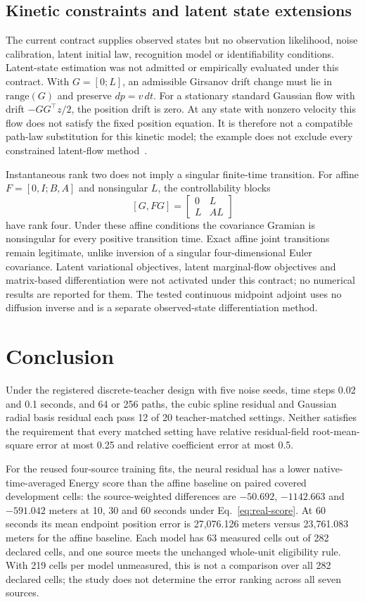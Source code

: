 \documentclass[11pt]{article}
\begin{document}
\subsection{Kinetic constraints and latent state extensions}\label{sec:latent}
The current contract supplies observed states but no observation likelihood, noise calibration, latent initial law, recognition model or identifiability conditions. Latent-state estimation was not admitted or empirically evaluated under this contract. With $G=[0;L]$, an admissible Girsanov drift change must lie in $\mathrm{range}(G)$ and preserve $dp=v\,dt$. For a stationary standard Gaussian flow with drift $-GG^\top z/2$, the position drift is zero. At any state with nonzero velocity this flow does not satisfy the fixed position equation. It is therefore not a compatible path-law substitution for this kinetic model; the example does not exclude every constrained latent-flow method~\cite{bartosh2025}.

Instantaneous rank two does not imply a singular finite-time transition. For affine $F=[0,I;B,A]$ and nonsingular $L$, the controllability blocks
\[
 [G,FG]=\begin{bmatrix}0&L\\L&AL\end{bmatrix}
\]
have rank four. Under these affine conditions the covariance Gramian is nonsingular for every positive transition time. Exact affine joint transitions remain legitimate, unlike inversion of a singular four-dimensional Euler covariance. Latent variational objectives, latent marginal-flow objectives and matrix-based differentiation were not activated under this contract; no numerical results are reported for them. The tested continuous midpoint adjoint uses no diffusion inverse and is a separate observed-state differentiation method.

\section{Conclusion}\label{sec:conclusion}
Under the registered discrete-teacher design with five noise seeds, time steps 0.02 and 0.1 seconds, and 64 or 256 paths, the cubic spline residual and Gaussian radial basis residual each pass 12 of 20 teacher-matched settings. Neither satisfies the requirement that every matched setting have relative residual-field root-mean-square error at most 0.25 and relative coefficient error at most 0.5.

For the reused four-source training fits, the neural residual has a lower native-time-averaged Energy score than the affine baseline on paired covered development cells: the source-weighted differences are $-50.692$, $-1142.663$ and $-591.042$ meters at 10, 30 and 60 seconds under Eq.~\eqref{eq:real-score}. At 60 seconds its mean endpoint position error is 27,076.126 meters versus 23,761.083 meters for the affine baseline. Each model has 63 measured cells out of 282 declared cells, and one source meets the unchanged whole-unit eligibility rule. With 219 cells per model unmeasured, this is not a comparison over all 282 declared cells; the study does not determine the error ranking across all seven sources.
\end{document}

